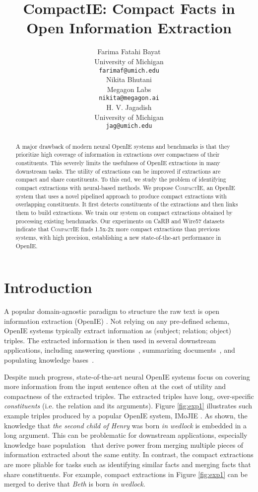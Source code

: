 \documentclass[11pt,a4paper]{article}
\title{CompactIE: Compact Facts in Open Information Extraction}
\author{Farima Fatahi Bayat\\
  University of Michigan \\
  \texttt{farimaf@umich.edu} \\\And
  Nikita Bhutani \\
  Megagon Labs \\
  \texttt{nikita@megagon.ai} \\\And
  H. V. Jagadish \\
  University of Michigan \\
  \texttt{jag@umich.edu} \\}
\date{}
\newcommand{\system}{{\textsc{CompactIE}}}
\begin{document}
\maketitle
\begin{abstract}


A major drawback of modern neural OpenIE systems and benchmarks is that they prioritize high coverage of information in extractions over compactness of their constituents.
This severely limits the usefulness of OpenIE extractions in many downstream tasks.
The utility of extractions can be improved if extractions are compact and share constituents. To this end, we study the problem of identifying compact extractions with neural-based methods. We propose \system{}, an OpenIE system that uses a novel pipelined approach to produce compact extractions with overlapping constituents. It first detects constituents of the extractions and then links them to build extractions. We train our system on compact extractions obtained by processing existing
benchmarks. Our experiments on CaRB and Wire57 datasets indicate that \system{} finds 1.5x-2x more compact extractions than previous systems, with high precision, establishing a new state-of-the-art performance in OpenIE.

\end{abstract}

\section{Introduction}


{A popular domain-agnostic paradigm to structure the raw text is open information extraction (OpenIE) \cite{textRunner}. Not relying on any pre-defined schema, OpenIE systems typically extract information as (subject; relation; object) triples. The extracted information is then used in several downstream applications, including answering questions~\cite{DBLP:journals/corr/KhotSC17}, summarizing documents~\cite{hao2018structured, ji2013open}, and populating knowledge bases~\cite{DBLP:journals/corr/abs-1910-08435}}.

{Despite much progress, state-of-the-art neural OpenIE systems focus on covering more information from the input sentence often at the cost of utility and compactness of the extracted triples. The extracted triples have long, over-specific {\it constituents} (i.e. the relation and its arguments).
Figure \ref{fig:exp1} illustrates such example triples produced by a popular OpenIE system, IMoJIE \cite{imojie}.
As shown, the knowledge that \emph{the second child of Henry} was born \emph{in wedlock} is embedded in a long argument. This can be problematic for downstream applications, especially knowledge base population~\cite{gashteovski2020aligning,stanovsky2015open} that derive power from merging multiple pieces of information extracted about the same entity. In contrast, the compact extractions are more pliable for tasks such as identifying similar facts and merging facts that share constituents. For example, compact extractions in Figure \ref{fig:exp1} can be merged to derive that \emph{Beth} is born \emph{in wedlock}.}
\end{document}
